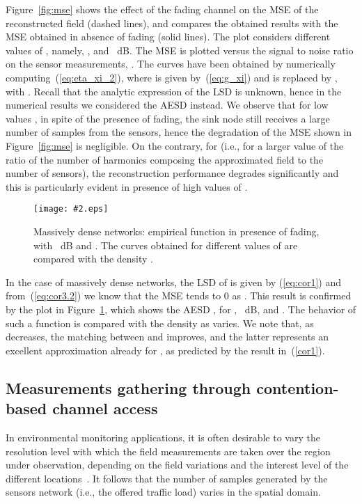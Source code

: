 \documentclass[11pt, draftcls, onecolumn, a4paper]{IEEEtran}
\newcommand{\insertfig}[4]{
\begin{figure}[ht]
\centerline{\texttt{[image: \#2.eps]}}
\caption{#3}\label{#4}\end{figure}}
\begin{document}
Figure~\ref{fig:mse} shows the effect of the fading channel on the MSE
of the reconstructed field (dashed lines), and compares the obtained
results with the MSE obtained in absence of fading (solid lines).  The
plot considers different values of , namely,
, and ~dB. The MSE is plotted versus the
signal to noise ratio on the sensor measurements, .  The
curves have been obtained by numerically
computing~(\ref{eq:eta_xi_2}), where  is given
by~(\ref{eq:g_xi}) and  is replaced by
, with .  Recall that the
analytic expression of the LSD  is unknown,
hence in the numerical results we considered the AESD
 instead. We observe that for
low values , in spite of the presence of fading, the sink node
still receives a large number of samples from the sensors, hence the
degradation of the MSE shown in Figure~\ref{fig:mse} is negligible. On the
contrary, for  (i.e., for a larger value of the ratio of
the number of harmonics composing the approximated field to the number 
of sensors), the reconstruction performance degrades
significantly and this is particularly evident in presence of high values
of .


\insertfig{0.8}{dense}{Massively dense networks: 
empirical function  
in presence of fading, 
with ~dB and . 
The curves obtained for different values of  are compared
with the density .}{fig:dense}

In the case of massively dense networks, the LSD
of  is given by (\ref{eq:cor1}) and from~(\ref{eq:cor3.2}) 
we know that
the MSE tends to 0 as . This result is confirmed by
the plot in Figure~\ref{fig:dense}, which shows the AESD , for
, ~dB, and . The behavior of such a function is
compared with the density  as  varies. We note
that, as  decreases, the matching between
 and  improves,
and the latter represents an excellent approximation already for
, as predicted by the result in~(\ref{cor1}).




\subsection{Measurements gathering through contention-based channel access}

In environmental monitoring applications, it is often desirable to vary
the resolution level with which the field measurements are taken
over the region under observation, depending on the field variations and 
the interest level of the different locations~\cite{Perillo04,Willett04}. 
It follows that the number of samples generated by the sensors network 
(i.e., the offered traffic load)  varies in the spatial 
domain. 
 
\end{document}
